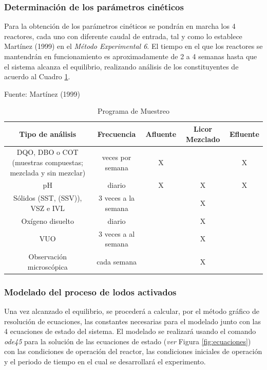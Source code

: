 \subsubsection*{Determinación de los parámetros cinéticos}
Para la obtención de los parámetros cinéticos se pondrán en marcha los 4 reactores, cada uno con diferente caudal de entrada, tal y como lo establece Martínez (1999) \citep{delgadillo} en el \emph{Método Experimental 6}. El tiempo en el que los reactores se mantendrán en funcionamiento es aproximadamente de 2 a 4 semanas hasta que el sistema alcanza el equilibrio, realizando análisis de los constituyentes de acuerdo al Cuadro \ref{tab:muestreo}.
	\begin{table}[!h]
		\begin{center}
		\caption{Programa de Muestreo}
		\label{tab:muestreo}
		\small{Fuente: Martínez (1999)}
		\begin{scriptsize}
			\begin{tabular}{|c|c|c|c|c|}
			\hline
			\rowcolor{blanc}
			Tipo de análisis & Frecuencia & Afluente & \multicolumn{1}{|m{2cm}|}{\centering Licor Mezclado} & Efluente \\
			\hline
			\multicolumn{1}{|m{5cm}|}{\centering DQO, DBO o COT (muestras compuestas; mezclada y sin mezclar)} & \multicolumn{1}{m{3cm}|}{\centering 3 veces por semana} & \multicolumn{1}{m{1.5cm}|}{\centering X} & \multicolumn{1}{m{2cm}|}{\centering } & \multicolumn{1}{m{1.5cm}|}{\centering X} \\
			\hline
			pH & diario & X & X & X \\
			\hline
			Sólidos (SST, (SSV)), VSZ e IVL & 3 veces a la semana & & X & \\
			\hline
			Oxígeno disuelto & diario & & X & \\
			\hline
			VUO & 3 veces a al semana & & X & \\
			\hline
			Observación microscópica & cada semana & & X & \\
			\hline
			\end{tabular}
		\end{scriptsize}
		\end{center}
	\end{table}
\subsubsection*{Modelado del proceso de lodos activados}
Una vez alcanzado el equilibrio, se procederá a calcular, por el método gráfico de resolución de ecuaciones, las constantes necesarias para el modelado junto con las 4 ecuaciones de estado del sistema. El modelado se realizará usando el comando \emph{ode45} para la solución de las ecuaciones de estado (\emph{ver} Figura \ref{fig:ecuaciones}) con las condiciones de operación del reactor, las condiciones iniciales de operación y el periodo de tiempo en el cual se desarrollará el experimento.

